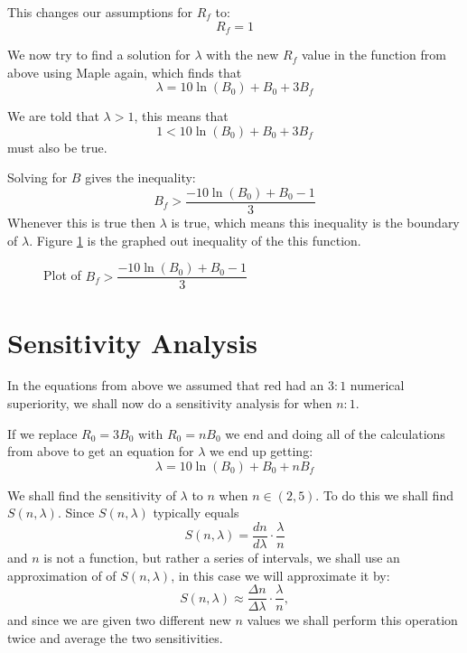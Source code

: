 \documentclass[12pt]{report}
\newcommand{\drawge}{-- (rel axis cs:1,0) -- (rel axis cs:1,1) -- (rel axis cs:0,1) \closedcycle}
\begin{document}
\smallskip

This changes our assumptions for $R_f$ to:
$$R_f=1$$

We now try to find a solution for $\lambda$ with the new $R_f$ value in the function from above using Maple again, which finds that $$\lambda = 10\ln{(B_0)}+B_0+3B_f$$

We are told that $\lambda > 1$, this means that $$1 < 10\ln{(B_0)}+B_0+3B_f$$ must also be true.

Solving for $B$ gives the inequality: $$B_f>\dfrac{-10\ln{(B_0)}+B_0-1}{3}$$
Whenever this is true then $\lambda$ is true, which means this inequality is the boundary of $\lambda$. Figure \ref{fig:inequality} is the graphed out inequality of the this function.

\smallskip

  \begin{figure}[th] 
    \centering 
    \label{fig:inequality} 
    \caption{Plot of $B_f>\dfrac{-10\ln{(B_0)}+B_0-1}{3}$} 
  \end{figure} 
  
  \section{Sensitivity Analysis}
  In the equations from above we assumed that red had an $3:1$ numerical superiority, we shall now do a sensitivity analysis for when $n:1$.
 
  \bigskip 
  
  If we replace $R_0=3B_0$ with $R_0=nB_0$ we end and doing all of the calculations from above to get an equation for $\lambda$ we end up getting: $$\lambda=10\ln{(B_0)}+B_0+nB_f$$
  
  We shall find the sensitivity of $\lambda$ to $n$ when $n \in{(2,5)}$. To do this we shall find $S(n,\lambda)$. Since $S(n,\lambda)$ typically equals $$S(n,\lambda)=\dfrac{dn}{d\lambda}\cdot \dfrac{\lambda}{n}$$ and $n$ is not a function, but rather a series of intervals, we shall use an approximation of of $S(n,\lambda)$, in this case we will approximate it by: $$S(n,\lambda)\approx \dfrac{\Delta n}{\Delta \lambda}\cdot \dfrac{\lambda}{n},$$ and since we are given two different new $n$ values we shall perform this operation twice and average the two sensitivities. 
  
\end{document}
